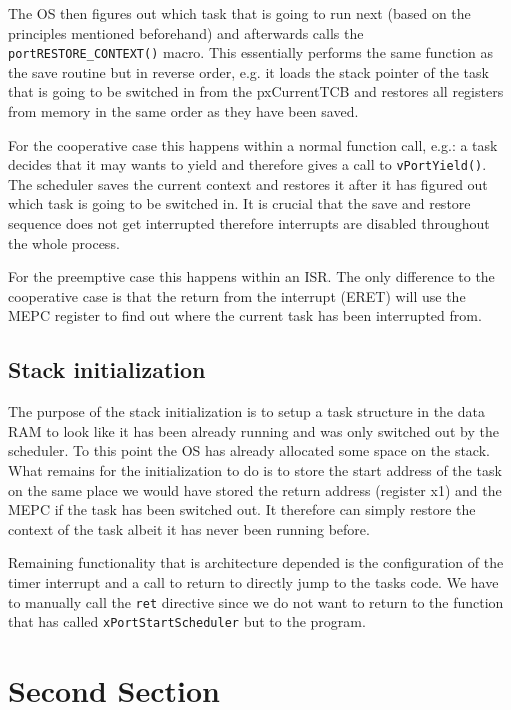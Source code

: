 The OS then figures out which task that is going to run next (based on the principles mentioned beforehand) and afterwards calls the \verb+portRESTORE_CONTEXT()+ macro. This essentially performs the same function as the save routine but in reverse order, e.g. it loads the stack pointer of the task that is going to be switched in from the pxCurrentTCB and restores all registers from memory in the same order as they have been saved.


For the cooperative case this happens within a normal function call, e.g.: a task decides that it may wants to yield and therefore gives a call to \verb+vPortYield()+. The scheduler saves the current context and restores it after it has figured out which task is going to be switched in. It is crucial that the save and restore sequence does not get interrupted therefore interrupts are disabled throughout the whole process.

For the preemptive case this happens within an ISR. The only difference to the cooperative case is that the return from the interrupt (ERET) will use the MEPC register to find out where the current task has been interrupted from.

\subsection{Stack initialization}

The purpose of the stack initialization is to setup a task structure in the data RAM to look like it has been already running and was only switched out by the scheduler. To this point the OS has already allocated some space on the stack. What remains for the initialization to do is to store the start address of the task on the same place we would have stored the return address (register x1) and the MEPC if the task has been switched out. It therefore can simply restore the context of the task albeit it has never been running before.

Remaining functionality that is architecture depended is the configuration of the timer interrupt and a call to return to directly jump to the tasks code. We have to manually call the \verb+ret+ directive since we do not want to return to the function that has called \verb+xPortStartScheduler+ but to the program.


\section{Second Section}


